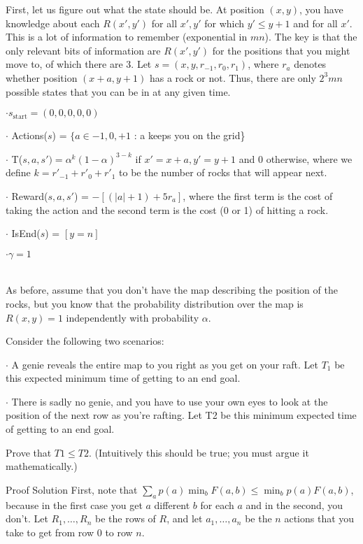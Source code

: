 \documentclass[4pt,landscape]{article}
\begin{document}
\begin{multicols*}{4}
{\tiny {\color{purple}{MDP:}} First, let us figure out what the state should be. At position $(x, y)$, you have knowledge about each $R(x', y')$ for all $x', y'$ for which $y' ≤ y + 1$ and for all $x'$. This is a lot of information to remember (exponential in $mn$). The key is that the only relevant bits of information are $R(x', y')$ for the positions that you might move to, of which there are 3. \tiny Let $s = (x, y, r_{−1}, r_0, r_1)$, where $r_a$ denotes whether position $(x + a, y + 1)$ has a rock or not. \tiny Thus, there are only $2^3mn$ possible states that you can be in at any given time.}\par
{$\cdot s_{\text{start}} = (0, 0, 0, 0, 0)$}\par
{$\cdot$ Actions($s$) = $\{a \in {−1, 0, +1}$ : a keeps you on the grid\}}\par
{$\cdot$ T($s, a, s') = \alpha^k(1 − \alpha)^{3−k}$ if $x' = x + a, y' = y + 1$ and $0$ otherwise, where we define $k = r'_{−1} + r'_0 + r'_1$ to be the number of rocks that will appear next.}\par
{$\cdot$  Reward($s, a, s'$) = $−[(|a|+1)+5r_a]$, where the first term is the cost of taking the action and the second term is the cost (0 or 1) of hitting a rock.}\par
{$\cdot$ IsEnd($s$) = $[y = n]$}\par
{$\cdot \gamma = 1$}\par
\hrulefill\\
{\tiny As before, assume that you don’t have the map describing the position of the rocks, but
you know that the probability distribution over the map is $R(x, y) = 1$ independently with
probability $\alpha$.}\par
{\tiny Consider the following two scenarios:}\par
{\tiny $\cdot$ A genie reveals the entire map to you right as you get on your raft. Let
$T_1$ be this expected minimum time of getting to an end goal.}\par
{\tiny $\cdot$ There is sadly no genie, and you have to use your own eyes to look at the position of
the next row as you’re rafting. Let T2 be this minimum expected time of getting to an end goal.}\par
{\tiny Prove that $T1 \le T2$. (Intuitively this should be true; you must argue it mathematically.)}\par
{\tiny {\color{purple} Proof Solution} First, note that $\sum_a p(a)\min_b F(a, b) \le \min_b p(a)F(a, b)$, because in the first case you get $a$ different $b$ for each $a$ and in the second, you don’t. Let $R_1, \hdots , R_n$ be the rows of $R$, and let $a_1, \hdots , a_n$ be the $n$ actions that you take to get from row $0$ to row $n$.}\par

\end{multicols*}
\end{document}
